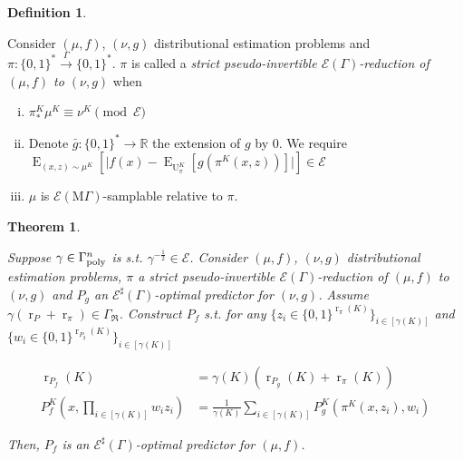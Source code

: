 \documentclass{article}
\numberwithin{equation}{section}
\theoremstyle{definition}
\newtheorem{definition}{Definition}[section]
\theoremstyle{plain}
\newtheorem{theorem}{Theorem}[section]
\newcommand{\Bool}{\{0,1\}}
\newcommand{\Words}{{\Bool^*}}
\DeclareMathOperator{\E}{E}
\DeclareMathOperator{\R}{r}
\DeclareMathOperator{\Un}{U}
\newcommand{\Reals}{\mathbb{R}}
\newcommand{\Abs}[1]{\lvert #1 \rvert}
\newcommand{\GrowR}{\Gamma_{\mathfrak{R}}}
\newcommand{\MGrow}{\mathrm{M}\Gamma}
\newcommand{\Fall}{\mathcal{E}}
\newcommand{\EG}{\Fall(\Gamma)}
\newcommand{\ESG}{\Fall^\sharp(\Gamma)}
\newcommand{\EMG}{\Fall(\MGrow)}
\newcommand{\BoolR}[1]{\Bool^{\R_{#1}(K)}}
\newcommand{\Scheme}{\xrightarrow{\Gamma}}
\begin{document}
\begin{samepage}
\begin{definition}
\label{def:sp_reduce}

Consider $(\mu,f)$, $(\nu,g)$ distributional estimation problems and ${\pi: \Words \Scheme \Words}$. $\pi$ is called a \emph{strict pseudo-invertible $\EG$-reduction of $(\mu,f)$ to $(\nu,g)$} when

\begin{enumerate}[(i)]

\item\label{con:def__sp_reduce__dist} $\pi_*^K\mu^{K} \equiv \nu^{K} \pmod \Fall$

\item\label{con:def__sp_reduce__fun} Denote ${\bar{g}: \Words \rightarrow \Reals}$ the extension of $g$ by 0. We require $\E_{(x,z) \sim \mu^{K}}[\Abs{f(x)-\E_{\Un_\pi^{K}}[g(\pi^{K}(x,z))]}] \in \Fall$

\item\label{con:def__sp_reduce__smp} $\mu$ is $\EMG$-samplable relative to $\pi$.

\end{enumerate}

\end{definition}
\end{samepage}

\begin{samepage}
\begin{theorem}
\label{thm:sp_reduce_sharp}

Suppose $\gamma \in \Gamma_{\textnormal{poly}}^n$ is s.t. $\gamma^{-\frac{1}{2}} \in \Fall$. Consider $(\mu,f)$, $(\nu,g)$ distributional estimation problems, $\pi$ a strict pseudo-invertible $\EG$-reduction of $(\mu, f)$ to $(\nu, g)$ and $P_g$ an $\ESG$-optimal predictor for $(\nu, g)$. Assume $\gamma (\R_P + \R_\pi) \in \GrowR$. Construct ${P_f}$ s.t. for any ${\{z_i \in \BoolR{\pi}\}_{i \in [\gamma(K)]}}$ and ${\{w_i \in \BoolR{P_g}\}_{i \in [\gamma(K)]}}$

\begin{align}
\label{eqn:thm__sp_reduce__rpf}\R_{P_f}(K) &= \gamma(K) (\R_{P_g}(K) + \R_\pi(K)) \\
\label{eqn:thm__sp_reduce__pf}P_f^K(x, \prod_{i \in [\gamma(K)]} w_i z_i) &= \frac{1}{\gamma(K)}\sum_{i \in [\gamma(K)]} P_g^K(\pi^K(x,z_i),w_i)
\end{align}

Then, $P_f$ is an $\ESG$-optimal predictor for $(\mu, f)$.

\end{theorem}
\end{samepage}
\end{document}
